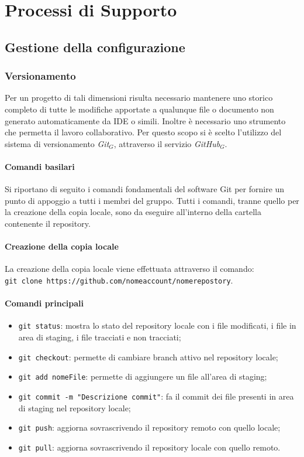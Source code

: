 \chapter{Processi di Supporto}
\section{Gestione della configurazione}
\subsection{Versionamento}
Per un progetto di tali dimensioni risulta necessario mantenere uno storico completo di tutte le modifiche apportate a qualunque file o documento non generato automaticamente da IDE o simili. Inoltre è necessario uno strumento che permetta il lavoro collaborativo. Per questo scopo si è scelto l'utilizzo del sistema di versionamento \textit{Git$_{G}$}, attraverso il servizio \textit{GitHub$_{G}$}.
\subsubsection{Comandi basilari}
Si riportano di seguito i comandi fondamentali del software Git per fornire un punto di appoggio a tutti i membri del gruppo. Tutti i comandi, tranne quello per la creazione della copia locale, sono da eseguire all'interno della cartella contenente il repository.
\subsubsection{Creazione della copia locale}
La creazione della copia locale viene effettuata attraverso il comando:\\
\texttt{git clone https://github.com/nomeaccount/nomerepostory}.
\subsubsection{Comandi principali}
\begin{itemize}
	\item \texttt{git status}: mostra lo stato del repository locale con i file modificati, i file in area di staging, i file tracciati e non tracciati;
	\item \texttt{git checkout}: permette di cambiare branch attivo nel repository locale;
	\item \texttt{git add nomeFile}: permette di aggiungere un file all'area di staging;
	\item \texttt{git commit -m "Descrizione commit"}: fa il commit dei file presenti in area di staging nel repository locale;
	\item \texttt{git push}: aggiorna sovrascrivendo il repository remoto con quello locale;
	\item \texttt{git pull}: aggiorna sovrascrivendo il repository locale con quello remoto.
\end{itemize}
